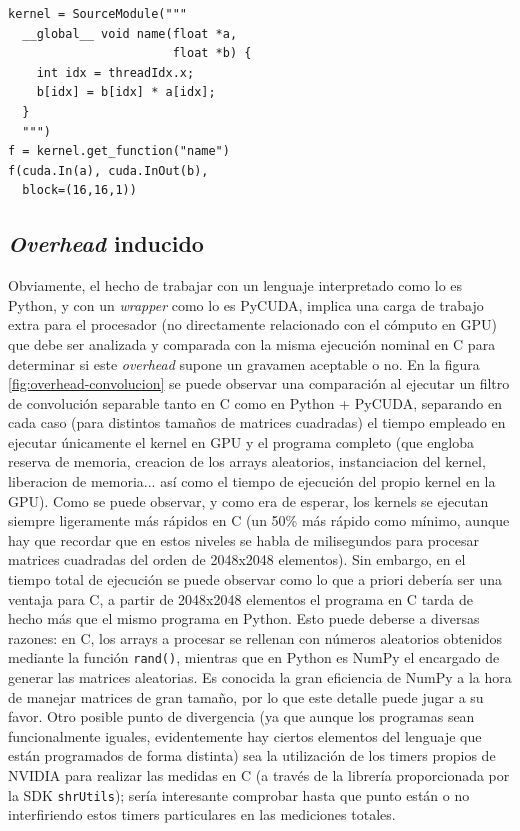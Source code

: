 \documentclass[twocolumn,twoside]{Jornadas}
\begin{document}
\begin{lstlisting}
kernel = SourceModule("""
  __global__ void name(float *a, 
                       float *b) {
    int idx = threadIdx.x;
    b[idx] = b[idx] * a[idx];
  }
  """)
f = kernel.get_function("name")
f(cuda.In(a), cuda.InOut(b), 
  block=(16,16,1))
\end{lstlisting}

\subsection{\emph{Overhead} inducido}

Obviamente, el hecho de trabajar con un lenguaje interpretado como lo es Python, y con un \emph{wrapper} como lo es PyCUDA, implica una carga de trabajo extra para el procesador (no directamente relacionado con el cómputo en GPU) que debe ser analizada y comparada con la misma ejecución nominal en C para determinar si este \emph{overhead} supone un gravamen aceptable o no. En la figura \ref{fig:overhead-convolucion} se puede observar una comparación al ejecutar un filtro de convolución separable \cite{imagecuda} tanto en C como en Python + PyCUDA, separando en cada caso (para distintos tamaños de matrices cuadradas) el tiempo empleado en ejecutar únicamente el kernel en GPU y el programa completo (que engloba reserva de memoria, creacion de los arrays aleatorios, instanciacion del kernel, liberacion de memoria... así como el tiempo de ejecución del propio kernel en la GPU). Como se puede observar, y como era de esperar, los kernels se ejecutan siempre ligeramente más rápidos en C (un 50\% más rápido como mínimo, aunque hay que recordar que en estos niveles se habla de milisegundos para procesar matrices cuadradas del orden de 2048x2048 elementos). Sin embargo, en el tiempo total de ejecución se puede observar como lo que a priori debería ser una ventaja para C, a partir de 2048x2048 elementos el programa en C tarda de hecho más que el mismo programa en Python. Esto puede deberse a diversas razones: en C, los arrays a procesar se rellenan con números aleatorios obtenidos mediante la función {\tt rand()}, mientras que en Python es NumPy el encargado de generar las matrices aleatorias. Es conocida la gran eficiencia de NumPy a la hora de manejar matrices de gran tamaño, por lo que este detalle puede jugar a su favor. Otro posible punto de divergencia (ya que aunque los programas sean funcionalmente iguales, evidentemente hay ciertos elementos del lenguaje que están programados de forma distinta) sea la utilización de los timers propios de NVIDIA para realizar las medidas en C (a través de la librería proporcionada por la SDK {\tt shrUtils}); sería interesante comprobar hasta que punto están o no interfiriendo estos timers particulares en las mediciones totales.
\end{document}
